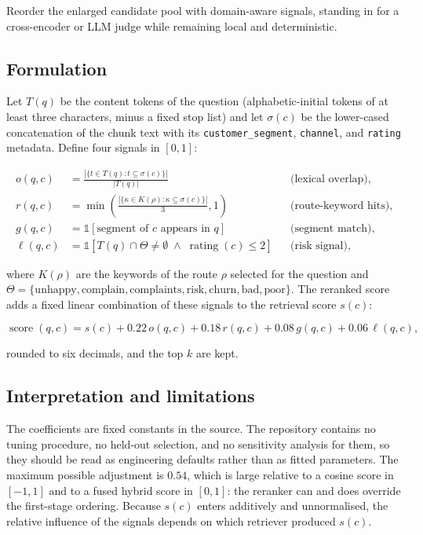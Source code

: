 Reorder the enlarged candidate pool with domain-aware signals, standing in for
a cross-encoder or LLM judge while remaining local and deterministic.

\subsection*{Formulation}

Let $T(q)$ be the content tokens of the question (alphabetic-initial tokens of
at least three characters, minus a fixed stop list) and let $\sigma(c)$ be the
lower-cased concatenation of the chunk text with its \texttt{customer\_segment},
\texttt{channel}, and \texttt{rating} metadata. Define four signals in $[0,1]$:

\begin{align}
o(q,c) &= \frac{\left|\{t \in T(q) : t \subseteq \sigma(c)\}\right|}{|T(q)|}
  && \text{(lexical overlap)}, \\
r(q,c) &= \min\!\left(\frac{|\{\kappa \in K(\rho) : \kappa \subseteq \sigma(c)\}|}{3}, 1\right)
  && \text{(route-keyword hits)}, \\
g(q,c) &= \mathbb{1}\!\left[\text{segment of } c \text{ appears in } q\right]
  && \text{(segment match)}, \\
\ell(q,c) &= \mathbb{1}\!\left[T(q) \cap \Theta \neq \emptyset
  \;\wedge\; \operatorname{rating}(c) \leq 2\right]
  && \text{(risk signal)},
\end{align}

where $K(\rho)$ are the keywords of the route $\rho$ selected for the question
and $\Theta = \{\text{unhappy},\allowbreak \text{complain},\allowbreak
\text{complaints},\allowbreak \text{risk},\allowbreak \text{churn},\allowbreak
\text{bad},\allowbreak \text{poor}\}$. The reranked score adds a fixed linear
combination of these signals to the retrieval score $s(c)$:

\begin{equation}
\operatorname{score}(q,c) = s(c)
  + 0.22\,o(q,c)
  + 0.18\,r(q,c)
  + 0.08\,g(q,c)
  + 0.06\,\ell(q,c),
\end{equation}

rounded to six decimals, and the top $k$ are kept.

\subsection*{Interpretation and limitations}

The coefficients are fixed constants in the source. The repository contains no
tuning procedure, no held-out selection, and no sensitivity analysis for them,
so they should be read as engineering defaults rather than as fitted
parameters. The maximum possible adjustment is $0.54$, which is large relative
to a cosine score in $[-1,1]$ and to a fused hybrid score in $[0,1]$: the
reranker can and does override the first-stage ordering. Because $s(c)$ enters
additively and unnormalised, the relative influence of the signals depends on
which retriever produced $s(c)$.

